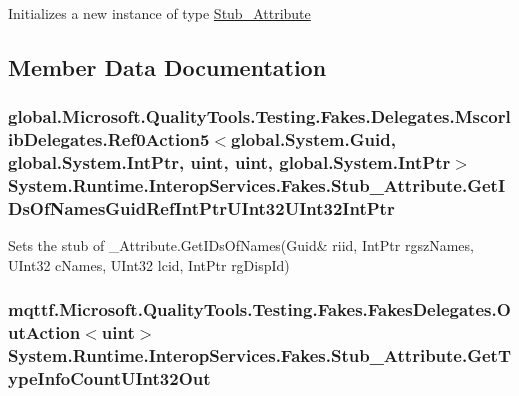 Initializes a new instance of type \hyperlink{class_system_1_1_runtime_1_1_interop_services_1_1_fakes_1_1_stub___attribute}{Stub\-\_\-\-Attribute}



\subsection{Member Data Documentation}
\hypertarget{class_system_1_1_runtime_1_1_interop_services_1_1_fakes_1_1_stub___attribute_ac09dcb88e3cef99bbc25b5793b2cf921}{
\subsubsection[{Get\-I\-Ds\-Of\-Names\-Guid\-Ref\-Int\-Ptr\-U\-Int32\-U\-Int32\-Int\-Ptr}]{\setlength{\rightskip}{0pt plus 5cm}global.\-Microsoft.\-Quality\-Tools.\-Testing.\-Fakes.\-Delegates.\-Mscorlib\-Delegates.\-Ref0\-Action5$<$global.\-System.\-Guid, global.\-System.\-Int\-Ptr, uint, uint, global.\-System.\-Int\-Ptr$>$ System.\-Runtime.\-Interop\-Services.\-Fakes.\-Stub\-\_\-\-Attribute.\-Get\-I\-Ds\-Of\-Names\-Guid\-Ref\-Int\-Ptr\-U\-Int32\-U\-Int32\-Int\-Ptr}}\label{class_system_1_1_runtime_1_1_interop_services_1_1_fakes_1_1_stub___attribute_ac09dcb88e3cef99bbc25b5793b2cf921}


Sets the stub of \-\_\-\-Attribute.\-Get\-I\-Ds\-Of\-Names(Guid\& riid, Int\-Ptr rgsz\-Names, U\-Int32 c\-Names, U\-Int32 lcid, Int\-Ptr rg\-Disp\-Id)

\hypertarget{class_system_1_1_runtime_1_1_interop_services_1_1_fakes_1_1_stub___attribute_a89ae0abf374e44257d2ba7c2fb028fab}{
\subsubsection[{Get\-Type\-Info\-Count\-U\-Int32\-Out}]{\setlength{\rightskip}{0pt plus 5cm}mqttf.\-Microsoft.\-Quality\-Tools.\-Testing.\-Fakes.\-Fakes\-Delegates.\-Out\-Action$<$uint$>$ System.\-Runtime.\-Interop\-Services.\-Fakes.\-Stub\-\_\-\-Attribute.\-Get\-Type\-Info\-Count\-U\-Int32\-Out}}\label{class_system_1_1_runtime_1_1_interop_services_1_1_fakes_1_1_stub___attribute_a89ae0abf374e44257d2ba7c2fb028fab}


